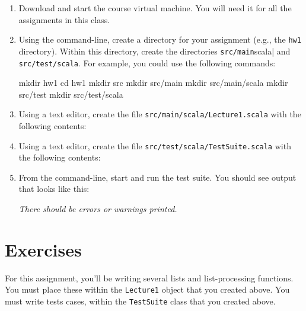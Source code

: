 \documentclass{book}
\begin{document}
\begin{enumerate}

\item Download and start the course virtual machine. You will need it for all
the assignments in this class.

\item Using the command-line, create a directory for your assignment (e.g., the
  \verb|hw1| directory). Within this directory, create the directories
  \verb|src/main|scala| and \verb|src/test/scala|. For example, you could use
  the following commands:
  \begin{console}
  mkdir hw1
  cd hw1
  mkdir src
  mkdir src/main
  mkdir src/main/scala
  mkdir src/test
  mkdir src/test/scala
  \end{console}

   \item Using a text editor, create the file \verb|src/main/scala/Lecture1.scala|
   with the following contents:

   \item Using a text editor, create the file \verb|src/test/scala/TestSuite.scala|
   with the following contents:

  \item From the command-line, start \sbt{} and run the test suite. You should
  see output that looks like this:

  

  \emph{There should be errors or warnings printed.}

\end{enumerate}

\section{Exercises}

For this assignment, you'll be writing several lists and list-processing
functions. You must place these within the \verb|Lecture1| object that
you created above. You must write tests cases, within the \verb|TestSuite|
class that you created above.
\end{document}

